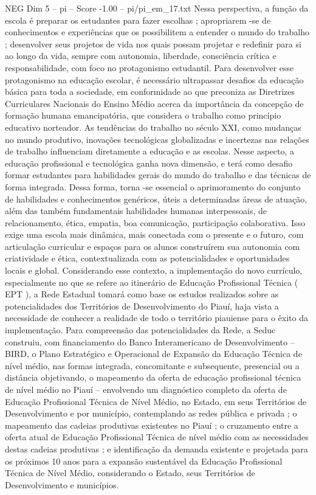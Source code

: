 \begin{textsample}{NEG Dim 5 – pi – Score -1.00 – pi/pi\_em\_17.txt}
Nessa perspectiva, a função da escola é preparar os estudantes para fazer escolhas ; apropriarem -se de conhecimentos e experiências que os possibilitem a entender o mundo do trabalho ; desenvolver seus projetos de vida nos quais possam projetar e redefinir para si ao longo da vida, sempre com autonomia, liberdade, consciência crítica e responsabilidade, com foco no protagonismo estudantil.
Para desenvolver esse protagonismo na educação escolar, é necessário ultrapassar desafios da educação básica para toda a sociedade, em conformidade ao que preconiza as Diretrizes Curriculares Nacionais do Ensino Médio acerca da importância da concepção de formação humana emancipatória, que considera o trabalho como princípio educativo norteador.
As tendências do trabalho no século XXI, como mudanças no mundo produtivo, inovações tecnológicas globalizadas e incertezas nas relações de trabalho influenciam diretamente a educação e as escolas.
Nesse aspecto, a educação profissional e tecnológica ganha nova dimensão, e terá como desafio formar estudantes para habilidades gerais do mundo do trabalho e das técnicas de forma integrada.
Dessa forma, torna -se essencial o aprimoramento do conjunto de habilidades e conhecimentos genéricos, úteis a determinadas áreas de atuação, além das também fundamentais habilidades humanas interpessoais, de relacionamento, ética, empatia, boa comunicação, participação colaborativa.
Isso exige uma escola mais dinâmica, mais conectada com o presente e o futuro, com articulação curricular e espaços para os alunos construírem sua autonomia com criatividade e ética, contextualizada com as potencialidades e oportunidades locais e global.
Considerando esse contexto, a implementação do novo currículo, especialmente no que se refere ao itinerário de Educação Profissional Técnica ( EPT ), a Rede Estadual tomará como base os estudos realizados sobre as potencialidades dos Territórios de Desenvolvimento do Piauí, haja vista a necessidade de conhecer a realidade de todo o território piauiense para o êxito da implementação.
Para compreensão das potencialidades da Rede, a Seduc construiu, com financiamento do Banco Interamericano de Desenvolvimento – BIRD, o Plano Estratégico e Operacional de Expansão da Educação Técnica de nível médio, nas formas integrada, concomitante e subsequente, presencial ou a distância objetivando, o mapeamento da oferta de educação profissional técnica de nível médio no Piauí – envolvendo um diagnóstico completo da oferta de Educação Profissional Técnica de Nível Médio, no Estado, em seus Territórios de Desenvolvimento e por município, contemplando as redes pública e privada ; o mapeamento das cadeias produtivas existentes no Piauí ; o cruzamento entre a oferta atual de Educação Profissional Técnica de nível médio com as necessidades destas cadeias produtivas ; e identificação da demanda existente e projetada para os próximos 10 anos para a expansão sustentável da Educação Profissional Técnica de Nível Médio, considerando o Estado, seus Territórios de Desenvolvimento e municípios.

\end{textsample}
